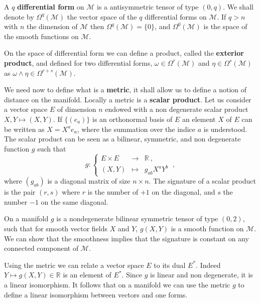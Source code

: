 \documentclass[12pt]{book}
\newcommand{\Mcal}{\mathcal{M}}
\newcommand{\Rbb}{\mathbb{R}}
\theoremstyle{break}
\begin{document}


A $q$ \textbf{differential form} on $\Mcal$ is a antisymmetric tensor of type $(0,q)$. We shall denote by $\Omega^q(\Mcal)$ the vector space of the $q$ differential forms on $\Mcal$. If $q > n$ with $n$ the dimension of $\Mcal$ then $\Omega^q(\Mcal)=\{0\}$, and $\Omega^0(\Mcal)$ is the space of the smooth functions on $\Mcal$.




On the space of differential form we can define a product, called the \textbf{exterior product}, and defined for two differential forms, $\omega \in \Omega^r(\Mcal)$ and $\eta \in \Omega^s(\Mcal)$ as $\omega \wedge \eta \in \Omega^{r+s}(\Mcal)$. 




We need now to define what is a \textbf{metric}, it shall allow us to define a notion of distance on the manifold. Locally a metric is a \textbf{scalar product}. Let us consider a vector space $E$ of dimension $n$ endowed with a non degenerate scalar product $X,Y \mapsto (X,Y)$. If $\{(e_a)\}$ is an orthonormal basis of $E$ an element $X$ of $E$ can be written as $X = X^a e_a$, where the summation over the indice $a$ is understood. The scalar product can be seen as a bilinear, symmetric, and non degenerate function $g$ such that
%
\begin{equation*}
g : \left\{ 
\begin{array}{lcl}
E \times E & \to & \Rbb \ , \\
(X,Y) & \mapsto & g_{ab} X^a Y^b
\end{array}
\right. \ ,
\end{equation*}
%
where $(g_{ab})$ is a diagonal matrix of size $n \times n$. The signature of a scalar product is the pair $(r,s)$ where $r$ is the number of $+1$ on the diagonal, and $s$ the number $-1$ on the same diagonal. 




On a manifold $g$ is a nondegenerate bilinear symmetric tensor of type $(0,2)$, such that for smooth vector fields $X$ and $Y$, $g(X,Y)$ is a smooth function on $\Mcal$. We can show that the smoothness implies that the signature is constant on any connected component of $\Mcal$. 




Using the metric we can relate a vector space $E$ to its dual $E^\ast$. Indeed $Y \mapsto g(X,Y) \in \Rbb$ is an element of $E^\ast$. Since $g$ is linear and non degenerate, it is a linear isomorphism. It follows that on a manifold we can use the metric $g$ to define a linear isomorphism between vectors and one forms. 
\end{document}
